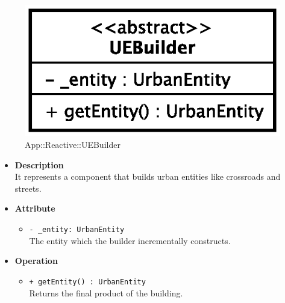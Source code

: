 \begin{figure}[h]
\centering
\includegraphics[scale=0.6,keepaspectratio]{images/solution/uebuilder.eps}
\caption{App::Reactive::UEBuilder}
\label{fig:sd-app-uebuilder}
\end{figure}
\FloatBarrier
\begin{itemize}
  \item \textbf{Description} \\
    It represents a component that builds urban entities like crossroads and
    streets.
  \item \textbf{Attribute}
  \begin{itemize}
    \item \texttt{- \_entity: UrbanEntity} \\
The entity which the builder incrementally constructs.
  \end{itemize}
  \item \textbf{Operation}
  \begin{itemize} 
    \item \texttt{+ getEntity() : UrbanEntity} \\
Returns the final product of the building.
  \end{itemize}
\end{itemize}
